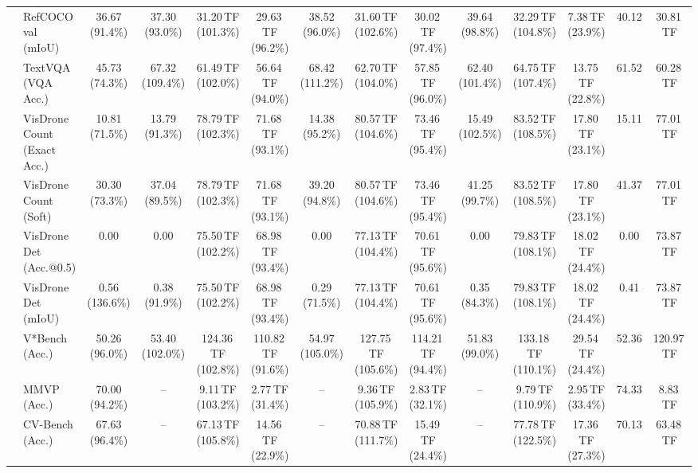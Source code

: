 \begin{table}[t]
\begin{center}
\begin{small}
\begin{sc}
{\begin{tabular}{llcccccccccccc}
& RefCOCO val (mIoU) & 36.67 (91.4\%) & 37.30 (93.0\%) & 31.20\,TF (101.3\%) & 29.63\,TF (96.2\%) & 38.52 (96.0\%) & 31.60\,TF (102.6\%) & 30.02\,TF (97.4\%) & 39.64 (98.8\%) & 32.29\,TF (104.8\%) & 7.38\,TF (23.9\%) & 40.12 & 30.81\,TF \\
& TextVQA (VQA Acc.) & 45.73 (74.3\%) & 67.32 (109.4\%) & 61.49\,TF (102.0\%) & 56.64\,TF (94.0\%) & 68.42 (111.2\%) & 62.70\,TF (104.0\%) & 57.85\,TF (96.0\%) & 62.40 (101.4\%) & 64.75\,TF (107.4\%) & 13.75\,TF (22.8\%) & 61.52 & 60.28\,TF \\
& VisDrone Count (Exact Acc.) & 10.81 (71.5\%) & 13.79 (91.3\%) & 78.79\,TF (102.3\%) & 71.68\,TF (93.1\%) & 14.38 (95.2\%) & 80.57\,TF (104.6\%) & 73.46\,TF (95.4\%) & 15.49 (102.5\%) & 83.52\,TF (108.5\%) & 17.80\,TF (23.1\%) & 15.11 & 77.01\,TF \\
& VisDrone Count (Soft) & 30.30 (73.3\%) & 37.04 (89.5\%) & 78.79\,TF (102.3\%) & 71.68\,TF (93.1\%) & 39.20 (94.8\%) & 80.57\,TF (104.6\%) & 73.46\,TF (95.4\%) & 41.25 (99.7\%) & 83.52\,TF (108.5\%) & 17.80\,TF (23.1\%) & 41.37 & 77.01\,TF \\
& VisDrone Det (Acc.@0.5) & 0.00 & 0.00 & 75.50\,TF (102.2\%) & 68.98\,TF (93.4\%) & 0.00 & 77.13\,TF (104.4\%) & 70.61\,TF (95.6\%) & 0.00 & 79.83\,TF (108.1\%) & 18.02\,TF (24.4\%) & 0.00 & 73.87\,TF \\
& VisDrone Det (mIoU) & 0.56 (136.6\%) & 0.38 (91.9\%) & 75.50\,TF (102.2\%) & 68.98\,TF (93.4\%) & 0.29 (71.5\%) & 77.13\,TF (104.4\%) & 70.61\,TF (95.6\%) & 0.35 (84.3\%) & 79.83\,TF (108.1\%) & 18.02\,TF (24.4\%) & 0.41 & 73.87\,TF \\
& V*Bench (Acc.) & 50.26 (96.0\%) & 53.40 (102.0\%) & 124.36\,TF (102.8\%) & 110.82\,TF (91.6\%) & 54.97 (105.0\%) & 127.75\,TF (105.6\%) & 114.21\,TF (94.4\%) & 51.83 (99.0\%) & 133.18\,TF (110.1\%) & 29.54\,TF (24.4\%) & 52.36 & 120.97\,TF \\
\midrule
{}
& MMVP (Acc.) & 70.00 (94.2\%) & -- & 9.11\,TF (103.2\%) & 2.77\,TF (31.4\%) & -- & 9.36\,TF (105.9\%) & 2.83\,TF (32.1\%) & -- & 9.79\,TF (110.9\%) & 2.95\,TF (33.4\%) & 74.33 & 8.83\,TF \\
& CV-Bench (Acc.) & 67.63 (96.4\%) & -- & 67.13\,TF (105.8\%) & 14.56\,TF (22.9\%) & -- & 70.88\,TF (111.7\%) & 15.49\,TF (24.4\%) & -- & 77.78\,TF (122.5\%) & 17.36\,TF (27.3\%) & 70.13 & 63.48\,TF \\

\end{tabular}}
\end{sc}
\end{small}
\end{center}
\end{table}
